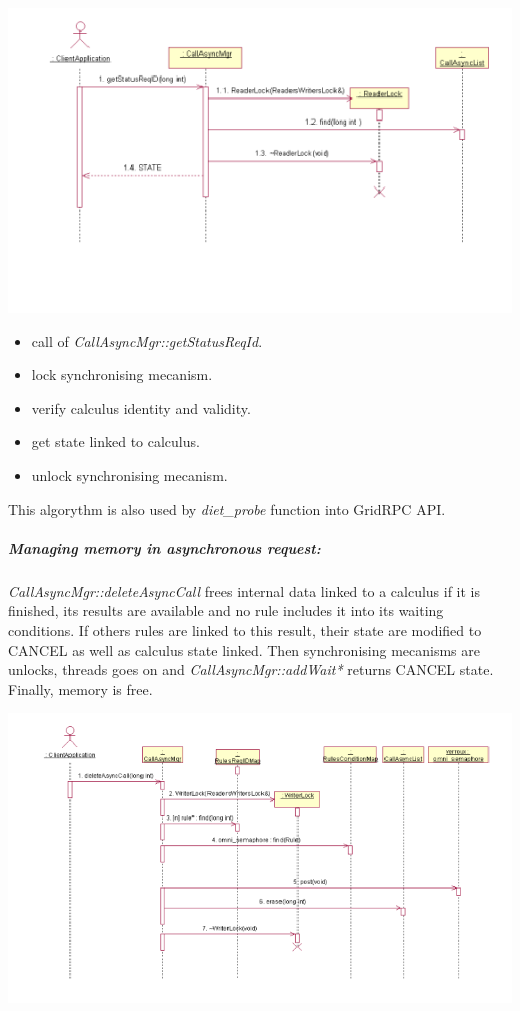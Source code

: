   \begin{center}
  \includegraphics{./fig/CallAsyncProbeSequenceDiagram1}
  \end{center}

  \begin{itemize}
  \item call of \emph{CallAsyncMgr::getStatusReqId}.
  \item lock synchronising mecanism.
  \item verify calculus identity and validity.
  \item get state linked to calculus.
  \item unlock synchronising mecanism.
  \end{itemize}

  \noindent
   This algorythm is also used by \emph{diet\_probe} function
  into GridRPC API.

  \subparagraph{Managing memory in asynchronous request:}
  \emph{CallAsyncMgr::deleteAsyncCall} frees internal data linked to a
  calculus if it is finished, its results are available and no rule includes
  it into its waiting conditions.
  If others rules are linked to this result, their state are modified to
  CANCEL as well as calculus state linked. Then synchronising mecanisms
  are unlocks, threads goes on and \emph{CallAsyncMgr::addWait*} returns
  CANCEL state. Finally, memory is free.

  \begin{center}
  \includegraphics{./fig/DietCancelSequenceDiagram}
  \end{center}

